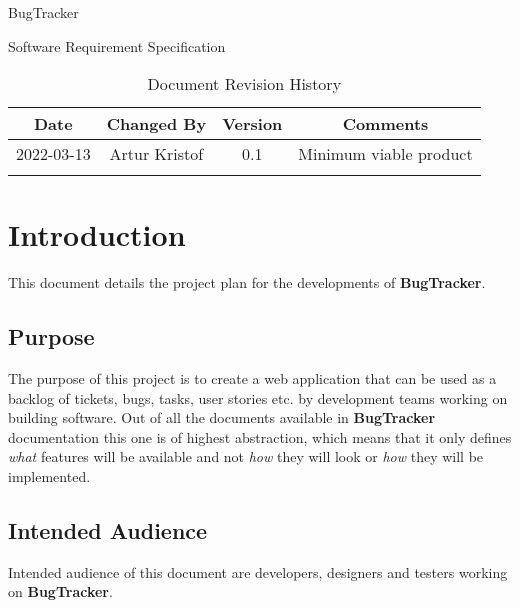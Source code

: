 \documentclass[a4paper]{article}
\newcommand{\bugTracker}{\textbf{BugTracker}}
\begin{document}
    \begin{titlepage}
        \vspace*{\fill}
        \begin{center}
            \huge
            BugTracker

            \vspace{0.4cm}
            \Huge
            Software Requirement Specification

            \vspace{3cm}
            \begin{table}[h]
                \centering
                \caption{Document Revision History}
                \begin{tabular}{cccc}
                    \hline
                    Date & Changed By & Version & Comments \\
                    \hline
                    2022-03-13 & Artur Kristof & 0.1 & Minimum viable product \\
                    \hfill & \hfill & \hfill & \hfill \\
                    \hline
                \end{tabular}
            \end{table}
        \end{center}
        \vspace*{\fill}
    \end{titlepage}

    \tableofcontents

    \section{Introduction}
    This document details the project plan for the developments of \bugTracker{}.
    \subsection{Purpose}
    The purpose of this project is to create a web application that can be used as a backlog of tickets, bugs, tasks, user stories etc. by development teams working on building software.
    Out of all the documents available in \bugTracker{} documentation this one is of highest abstraction, which means that it only defines \textit{what} features will be available
    and not \textit{how} they will look or \textit{how} they will be implemented.
    \subsection{Intended Audience}
    Intended audience of this document are developers, designers and testers working on \bugTracker{}.
\end{document}
